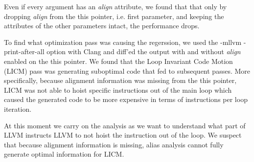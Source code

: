 Even if every argument has an \textit{align} attribute, we found that that only
by dropping \textit{align} from the this pointer, i.e. first parameter, and
keeping the attributes of the other parameters intact, the performance drops.

To find what optimization pass was causing the regerssion, we used the -mllvm
-print-after-all option with Clang and diff'ed the output with and without
\textit{align} enabled on the this pointer. We found that the Loop Invariant
Code Motion (LICM) pass was generating suboptimal code that fed to subsequent
passes. More specifically, because alignment information was missing from the
this pointer, LICM was not able to hoist specific instructions out of the main
loop which caused the generated code to be more expensive in terms of
instructions per loop iteration.

At this moment we carry on the analysis as we want to understand what part of
LLVM instructs LLVM to not hoist the instruction out of the loop. We suspect
that because alignment information is missing, alias analysis cannot fully
generate optimal information for LICM.
